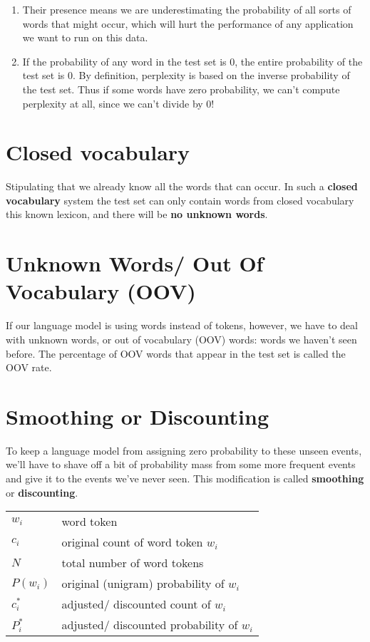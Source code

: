 \begin{enumerate}
    \item Their presence means we are underestimating the probability of all sorts of words that might occur, which will hurt the performance of any application we want to run on this data.
    \item If the probability of any word in the test set is 0, the entire probability of the test set is 0. By definition, perplexity is based on the inverse probability of the test set. Thus if some words have zero probability, we can’t compute perplexity at all, since we can’t divide by 0!
\end{enumerate}


\section{Closed vocabulary \cite{nlp-1}}

Stipulating that we already know all the words that can occur. In such a \textbf{closed vocabulary} system the test set can only contain words from closed vocabulary this known lexicon, and there will be \textbf{no unknown words}.


\section{Unknown Words/ Out Of Vocabulary (OOV) \cite{nlp-1}}

If our language model is using words instead of tokens, however, we have to deal with unknown words, or out of vocabulary (OOV) words: words we haven’t seen before. The percentage of OOV words that appear in the test set is called the OOV rate.


\section{Smoothing or Discounting \cite{nlp-1}}

To keep a language model from assigning zero probability to these unseen events, we’ll have to shave off a bit of probability mass from some more frequent events and give it to the events we’ve never seen. This modification is called \textbf{smoothing} or \textbf{discounting}.

\begin{table}[H]
    \begin{tabular}{l l}
        $w_i$ & word token \\
        $c_i$ & original count of word token $w_i$ \\
        $N$ & total number of word tokens \\
        $P(w_i)$ & original (unigram) probability of $w_i$ \\
        $c_i^*$ & adjusted/ discounted count of $w_i$ \\
        $P_i^*$ & adjusted/ discounted probability of $w_i$ \\
    \end{tabular}
\end{table}


